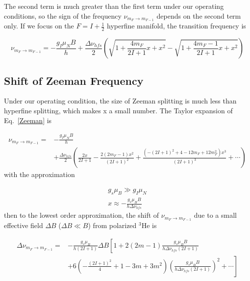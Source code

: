The second term is much greater than the first term under our operating conditions, so the sign of the frequency $\nu_{m_{F}\rightarrow m_{F-1}}$ depends on the second term only. If we focus on the $F=I+\frac{1}{2}$ hyperfine manifold, the transition frequency is

\begin{equation}\label{Zeeman}
\nu_{m_{F}\rightarrow m_{F-1}} = -\frac{g_{I}\mu_{N}B}{h}+ \frac{\Delta \nu_{hfs}}{2}\left(\sqrt{1+\frac{4m_{F}}{2I+1}x+x^{2}}-\sqrt{1+\frac{4m_{F}-1}{2I+1}x+x^{2}}\right)
\end{equation}

\subsection{Shift of Zeeman Frequency}

Under our operating condition, the size of Zeeman splitting is much less than hyperfine splitting, which makes x a small number. The Taylor expansion of Eq.~\ref{Zeeman} is

\begin{equation}\label{Taylorwithx}
\begin{split}
\nu_{m_{F}\rightarrow m_{F-1}}=&-\frac{g_{I}\mu_{N}B}{h}\\
&+\frac{\Delta\nu_{hfs}}{2}\left(\frac{2x}{2I+1}-\frac{2(2m_{F}-1)x^{2}}{(2I+1)^{2}}+\frac{(-(2I+1)^{2}+4-12m_{F}+12m_{F}^{2})x^{3}}{(2I+1)^{3}}+\cdots\right)
\end{split}
\end{equation}
with the approximation

\begin{subequations}
	\begin{gather}
	g_{s}\mu_{B} \gg g_{I}\mu_{N}\\
	x \approx -\frac{g_{s}\mu_{B}B}{h\Delta \nu_{hfs}}
	\end{gather}
\end{subequations}
then to the lowest order approximation, the shift of $\nu_{m_{F}\rightarrow m_{F-1}}$ due to a small effective field $\Delta B$ ($\Delta B \ll B$) from polarized $^{3}$He is

\begin{equation}
\begin{split}
\Delta \nu_{m_{F}\rightarrow m_{F-1}} = &-\frac{g_{s}\mu_{B}}{h(2I+1)} \Delta B \left[1+ 2(2m-1)\frac{g_{s}\mu_{B}B}{h \Delta\nu_{hfs}(2I+1)}\right.\\ 
&\left.+6\left(-\frac{(2I+1)^{2}}{4}+1-3m+3m^{2}\right)\left(\frac{g_{s}\mu_{B}B}{h \Delta\nu_{hfs}(2I+1)}\right)^{2}+\cdots\right]
\end{split}
\end{equation}


